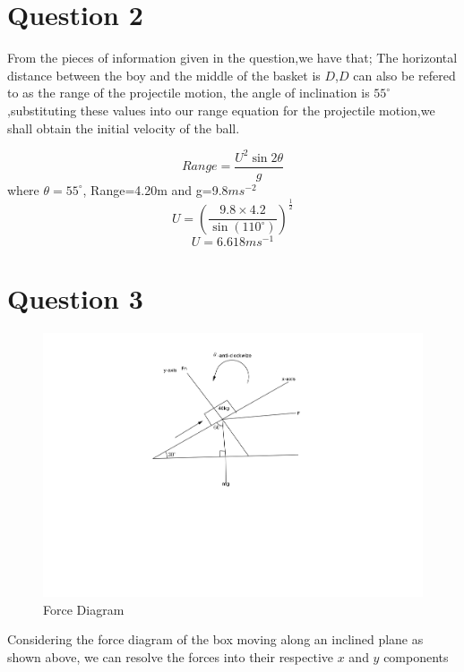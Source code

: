 \documentclass[10pt,a4paper]{article}
\begin{document}
\section*{Question 2}
From the pieces of information given in the question,we have that;
The horizontal distance between the boy and the middle of the basket is $D$,$D$ can also be refered to as the range of the projectile motion, the angle of inclination is $55^\circ$,substituting these values into our range equation for the projectile motion,we shall obtain the initial velocity of the ball.

$$Range=\frac{U^2\sin2\theta}{g}$$
where $\theta=55^\circ$, Range=4.20m and g=9.8$ms^{-2}$\\
$$U=\left(\frac{9.8\times4.2}{\sin\left(110^\circ\right)}\right)^{\frac{1}{2}}$$
$$U=6.618ms^{-1}$$

\newpage
\section*{Question 3}
\begin{figure}[h!]\label{d1}
\centering
\includegraphics[scale=0.5]{ttt.png}
\caption{Force Diagram}
\end{figure}
Considering the force diagram of the box moving along an inclined plane as shown above, we can resolve the forces into their respective $x$ and $y$ components
\end{document}
